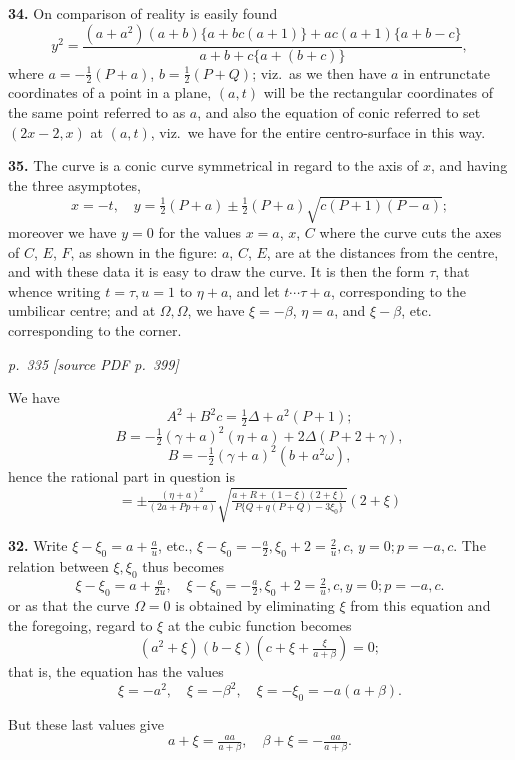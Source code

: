 \documentclass[11pt,a4paper]{article}
\newcommand{\pagemarker}[2]{\par\bigskip\noindent\textit{p.~#1 [source PDF p.~#2]}\par\smallskip}
\begin{document}
\textbf{34.} On comparison of reality is easily found
\[
y^2 = \frac{(a + a^2)(a + b)\{a + bc(a + 1)\} + a c(a + 1)\{a + b - c\}}{a + b + c\{a + (b + c)\}},
\]
where $a = -\tfrac{1}{2}(P + a)$, $b = \tfrac{1}{2}(P + Q)$; viz.\ as we then have $a$ in entrunctate coordinates of a point in a plane, $(a, t)$ will be the rectangular coordinates of the same point referred to as $a$, and also the equation of conic referred to set $(2x - 2, x)$ at $(a, t)$, viz.\ we have for the entire centro-surface in this way.

\textbf{35.} The curve is a conic curve symmetrical in regard to the axis of $x$, and having the three asymptotes,
\[
x = -t,\quad y = \tfrac{1}{2}(P + a) \pm \tfrac{1}{2}(P + a)\sqrt{c(P + 1)(P - a)};
\]
moreover we have $y = 0$ for the values $x = a$, $x$, $C$ where the curve cuts the axes of $C$, $E$, $F$, as shown in the figure: $a$, $C$, $E$, are at the distances from the centre, and with these data it is easy to draw the curve. It is then the form $\tau$, that whence writing $t = \tau, u = 1$ to $\eta + a$, and let $t \cdots \tau + a$, corresponding to the umbilicar centre; and at $\Omega, \Omega$, we have $\xi = -\beta$, $\eta = a$, and $\xi - \beta$, etc. corresponding to the corner.

\clearpage

\pagemarker{335}{399}

We have
\[
A^2 + B^2 c = \tfrac{1}{2}\Delta + a^2(P + 1);
\]
\[
B = -\tfrac{1}{2}(\gamma + a)^2(\eta + a) + 2\Delta(P + 2 + \gamma),
\]
\[
B = -\tfrac{1}{2}(\gamma + a)^2(b + a^2 \omega),
\]
hence the rational part in question is
\[
= \pm \tfrac{(\eta + a)^2}{(2a + Pp + a)}\sqrt{\tfrac{a + R + (1 - \xi)(2 + \xi)}{P\{Q + q(P + Q) - 3\xi_0\}}}(2 + \xi)
\]

\textbf{32.} Write $\xi - \xi_0 = a + \tfrac{a}{u}$, etc., $\xi - \xi_0 = -\tfrac{a}{2}, \xi_0 + 2 = \tfrac{2}{u}, c$, $y = 0; p = -a, c$. The relation between $\xi, \xi_0$ thus becomes
\[
\xi - \xi_0 = a + \tfrac{a}{2u}, \quad \xi - \xi_0 = -\tfrac{a}{2}, \xi_0 + 2 = \tfrac{2}{u}, c, y = 0; p = -a, c.
\]
or as that the curve $\Omega = 0$ is obtained by eliminating $\xi$ from this equation and the foregoing, regard to $\xi$ at the cubic function becomes
\[
(a^2 + \xi)(b - \xi)\!\left(c + \xi + \tfrac{\xi}{a + \beta}\right) = 0;
\]
that is, the equation has the values
\[
\xi = -a^2, \quad \xi = -\beta^2, \quad \xi = -\xi_0 = -a(a + \beta).
\]

But these last values give
\[
a + \xi = \tfrac{a a}{a + \beta}, \quad \beta + \xi = -\tfrac{a a}{a + \beta}.
\]
\end{document}
